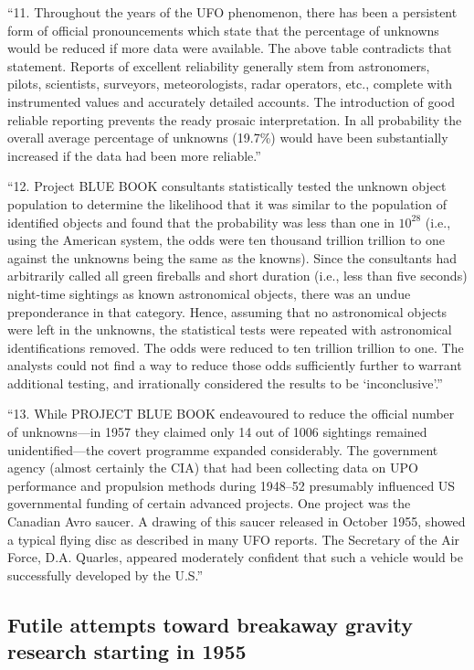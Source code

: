 \begin{svgraybox}
 ``11. Throughout the years of the UFO phenomenon, there has been
a persistent form of official pronouncements which state that the
percentage of unknowns would be reduced if more data were available.
The above table contradicts that statement. Reports of excellent
reliability generally stem from astronomers, pilots, scientists,
surveyors, meteorologists, radar operators, etc., complete with
instrumented values and accurately detailed accounts. The
introduction of good reliable reporting prevents the ready prosaic
interpretation. In all probability the overall average percentage
of unknowns (19.7{\%}) would have been substantially increased if the
data had been more reliable.''

``12. Project BLUE BOOK consultants statistically tested the
unknown object population to determine the likelihood that it was
similar to the population of identified objects and found that the
probability was less than one in $10^{28}$ (i.e., using the American
system, the odds were ten thousand trillion trillion to one
against the unknowns being the same as the knowns). Since the
consultants had arbitrarily called all green fireballs and short
duration (i.e., less than five seconds) night-time sightings as
known astronomical objects, there was an undue preponderance in
that category. Hence, assuming that no astronomical objects were
left in the unknowns, the statistical tests were repeated with
astronomical identifications removed. The odds were reduced to
ten trillion trillion to one. The analysts could not find a way
to reduce those odds sufficiently further to warrant additional
testing, and irrationally considered the results to be `inconclusive'.''

``13. While PROJECT BLUE BOOK endeavoured to reduce the official
number of unknowns---in 1957 they claimed only 14 out of 1006
sightings remained unidentified---the covert programme expanded
considerably. The government agency (almost certainly the CIA) that
had been collecting data on UPO performance and propulsion methods
during 1948--52 presumably influenced US governmental funding of
certain advanced projects. One project was the Canadian Avro saucer.
A drawing of this saucer released in October 1955, showed a typical
flying disc as described in many UFO reports. The Secretary of the
Air Force, D.A. Quarles, appeared moderately confident that such
a vehicle would be successfully developed by the U.S.''
\end{svgraybox}


\subsection{Futile attempts toward breakaway gravity research starting in 1955}
\label{2023-UFO-part-Perception-types-USA-bapbbera}


